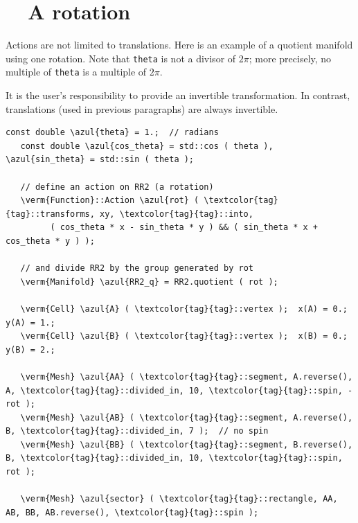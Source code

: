 \section{~~A rotation}\label{\numb section 7.\numb parag 11}

Actions are not limited to translations.
Here is an example of a quotient manifold using one rotation.
Note that {\small\tt theta} is not a divisor of $ 2\pi $;
more precisely, no multiple of {\small\tt theta} is a multiple of $ 2\pi $.

It is the user's responsibility to provide an invertible transformation.
In contrast, translations (used in previous paragraphs) are always invertible.

\begin{Verbatim}[commandchars=\\\{\},formatcom=\small\tt,frame=single,
   label=parag-\ref{\numb section 7.\numb parag 11}.cpp,rulecolor=\color{coment},
   baselinestretch=0.94,framesep=2mm                                             ]
   const double \azul{theta} = 1.;  // radians
   const double \azul{cos_theta} = std::cos ( theta ), \azul{sin_theta} = std::sin ( theta );
	
   // define an action on RR2 (a rotation)
   \verm{Function}::Action \azul{rot} ( \textcolor{tag}{tag}::transforms, xy, \textcolor{tag}{tag}::into,
         ( cos_theta * x - sin_theta * y ) && ( sin_theta * x + cos_theta * y ) );

   // and divide RR2 by the group generated by rot
   \verm{Manifold} \azul{RR2_q} = RR2.quotient ( rot );

   \verm{Cell} \azul{A} ( \textcolor{tag}{tag}::vertex );  x(A) = 0.;  y(A) = 1.;
   \verm{Cell} \azul{B} ( \textcolor{tag}{tag}::vertex );  x(B) = 0.;  y(B) = 2.;

   \verm{Mesh} \azul{AA} ( \textcolor{tag}{tag}::segment, A.reverse(), A, \textcolor{tag}{tag}::divided_in, 10, \textcolor{tag}{tag}::spin, -rot );
   \verm{Mesh} \azul{AB} ( \textcolor{tag}{tag}::segment, A.reverse(), B, \textcolor{tag}{tag}::divided_in, 7 );  // no spin
   \verm{Mesh} \azul{BB} ( \textcolor{tag}{tag}::segment, B.reverse(), B, \textcolor{tag}{tag}::divided_in, 10, \textcolor{tag}{tag}::spin, rot );

   \verm{Mesh} \azul{sector} ( \textcolor{tag}{tag}::rectangle, AA, AB, BB, AB.reverse(), \textcolor{tag}{tag}::spin );
\end{Verbatim}

